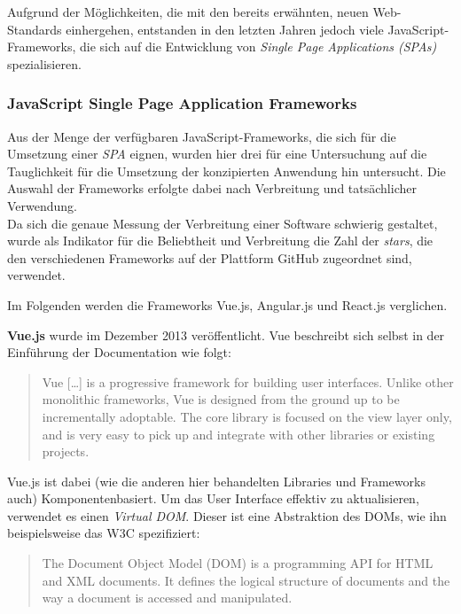 Aufgrund der Möglichkeiten, die mit den bereits erwähnten, neuen Web-Standards einhergehen, entstanden in den letzten Jahren jedoch viele JavaScript-Frameworks, die sich auf die Entwicklung von \textit{Single Page Applications (SPAs)} spezialisieren.


\subsubsection{JavaScript Single Page Application Frameworks}

Aus der Menge der verfügbaren JavaScript-Frameworks, die sich für die Umsetzung einer \textit{SPA} eignen, wurden hier drei für eine Untersuchung auf die Tauglichkeit für die Umsetzung der konzipierten Anwendung hin untersucht.
Die Auswahl der Frameworks erfolgte dabei nach Verbreitung und tatsächlicher Verwendung.\\
Da sich die genaue Messung der Verbreitung einer Software schwierig gestaltet, wurde als Indikator für die Beliebtheit und Verbreitung die Zahl der \textit{stars}\footnotemark{}, die den verschiedenen Frameworks auf der Plattform GitHub  zugeordnet sind, verwendet.


Im Folgenden werden die Frameworks Vue.js, Angular.js und React.js verglichen.

\textbf{Vue.js} \cite{vue} wurde im Dezember 2013 veröffentlicht.
Vue beschreibt sich selbst in der Einführung der Documentation wie folgt:

\begin{quote}
  Vue […] is a progressive framework for building user interfaces. Unlike other monolithic frameworks, Vue is designed from the ground up to be incrementally adoptable. The core library is focused on the view layer only, and is very easy to pick up and integrate with other libraries or existing projects. \cite{VueIntro}
\end{quote}

Vue.js ist dabei (wie die anderen hier behandelten Libraries und Frameworks auch) Komponentenbasiert. Um das User Interface effektiv zu aktualisieren, verwendet es einen \textit{Virtual DOM}. Dieser ist eine Abstraktion des DOMs, wie ihn beispielsweise das W3C spezifiziert:

\begin{quote}
  The Document Object Model (DOM) is a programming API for HTML and XML documents. It defines the logical structure of documents and the way a document is accessed and manipulated.  \cite{w3cDOM}
\end{quote}

